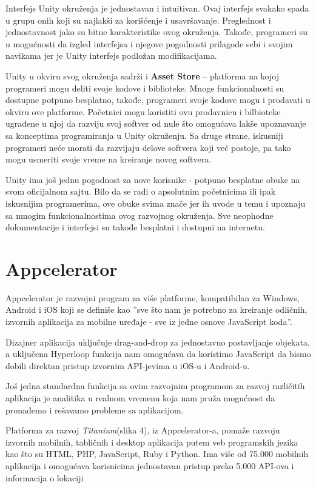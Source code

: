 \documentclass[12pt]{article}
\begin{document}
Interfejs Unity okruženja je jednostavan i intuitivan. 
Ovaj interfejs svakako spada u grupu onih koji su najlakši za korišćenje i usavršavanje. Preglednost i jednostavnost jako su bitne karakteristike
ovog okruženja. Takođe, programeri su u mogućnosti da izgled interfejsa i njegove pogodnosti prilagode sebi i svojim navikama jer je Unity interfejs
podložan modifikacijama. 

Unity u okviru svog okruženja sadrži i \textbf{Asset Store} – platforma na kojoj programeri mogu deliti svoje kodove i biblioteke. Mnoge funkcionalnosti su dostupne potpuno besplatno, takođe, programeri svoje kodove mogu i prodavati u okviru ove platforme. Početnici mogu koristiti ovu prodavnicu i bilbioteke ugrađene u njoj da razviju svoj softver od nule što omogućava lakše upoznavanje sa konceptima programiranja u Unity okruženju.
Sa druge strane, iskusniji programeri neće morati da razvijaju delove softvera koji već postoje, pa tako mogu usmeriti svoje vreme na kreiranje novog softvera.

Unity ima još jednu pogodnost za nove korisnike - potpuno besplatne obuke na svom oficijalnom sajtu.
Bilo da se radi o apsolutnim početnicima ili ipak iskusnijim programerima, ove obuke svima znače jer ih uvode u temu i upoznaju sa mnogim funkcionalnostima ovog razvojnog okruženja.
Sve neophodne dokumentacije i interfejsi su takođe besplatni i dostupni na internetu.

\section{Appcelerator}
Appcelerator je razvojni program za više platforme, kompatibilan za Windows, Android i iOS koji se definiše kao  ''sve što nam je potrebno za kreiranje odličnih, izvornih aplikacija za mobilne uređaje - sve iz jedne osnove JavaScript koda''.\cite{Appcelerator}

Dizajner aplikacija uključuje drag-and-drop za jednostavno postavljanje objekata, a uključena Hyperloop funkcija nam omogućava da koristimo JavaScript da bismo dobili direktan pristup izvornim API-jevima u iOS-u i Android-u.

Još jedna standardna funkcija sa ovim razvojnim programom za razvoj različitih aplikacija je analitika u realnom vremenu koja nam pruža mogućnost da pronađemo i rešavamo probleme sa aplikacijom.

Platforma za razvoj \textit{Titanium}(slika 4), iz Appcelerator-a, pomaže razvoju izvornih mobilnih, tabličnih i desktop aplikacija putem veb programskih jezika kao što su HTML, PHP, JavaScript, Ruby i Python. Ima više od 75.000 mobilnih aplikacija i omogućava korisnicima jednostavan pristup preko 5.000 API-ova i informacija o lokaciji
\end{document}
